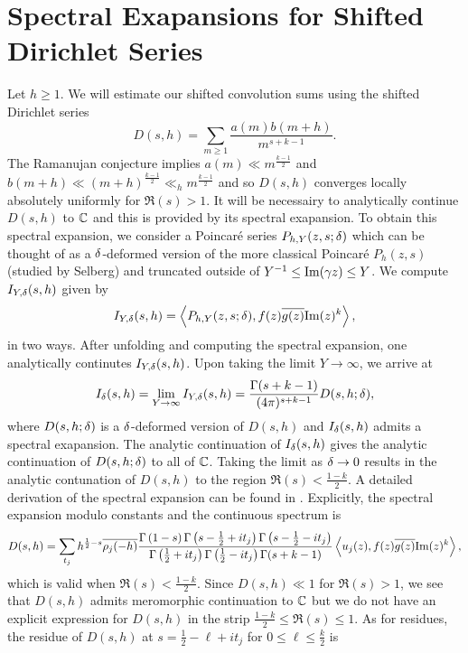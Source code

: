 \documentclass[12pt,reqno,oneside]{amsart}
\begin{document}
\section{Spectral Exapansions for Shifted Dirichlet Series}
  Let $h \ge 1$. We will estimate our shifted convolution sums using the shifted Dirichlet series
  \[
    D(s,h) = \sum_{m \ge 1}\frac{a(m)b(m+h)}{m^{s+k-1}}.
  \]
  The Ramanujan conjecture implies $a(m) \ll m^{\frac{k-1}{2}}$ and $b(m+h) \ll (m+h)^{\frac{k-1}{2}} \ll_{h} m^{\frac{k-1}{2}}$ and so $D(s,h)$ converges locally absolutely uniformly for $\Re(s) > 1$. It will be necessairy to analytically continue $D(s,h)$ to $\mathbb{C}$ and this is provided by its spectral exapansion. To obtain this spectral expansion, we consider a Poincar\'e series $P_{h,Y}(z,s;\delta)$ which can be thought of as a $\delta$-deformed version of the more classical  Poincar\'e $P_{h}(z,s)$ (studied by Selberg) and truncated outside of $Y^{-1} \le \mathrm{Im}(\gamma z) \le Y$. We compute $I_{Y,\delta}(s,h)$ given by
  \[
    I_{Y,\delta}(s,h) = \left\langle P_{h,Y}(z,s;\delta),f(z)\overline{g(z)}\mathrm{Im}(z)^{k}\right\rangle,
  \]
  in two ways. After unfolding and computing the spectral expansion, one analytically continutes $I_{Y,\delta}(s,h)$. Upon taking the limit $Y \to \infty$, we arrive at
  \[
    I_{\delta}(s,h) = \lim_{Y \to \infty}I_{Y,\delta}(s,h) = \frac{\Gamma(s+k-1)}{(4\pi)^{s+k-1}}D(s,h;\delta),
  \]
  where $D(s,h;\delta)$ is a $\delta$-deformed version of $D(s,h)$ and $I_{\delta}(s,h)$ admits a spectral exapansion. The analytic continuation of $I_{\delta}(s,h)$ gives the analytic continuation of $D(s,h;\delta)$ to all of $\mathbb{C}$. Taking the limit as $\delta \to 0$ results in the analytic contunation of $D(s,h)$ to the region $\Re(s) < \frac{1-k}{2}$. A detailed derivation of the spectral expansion can be found in \cite{HH}. Explicitly, the spectral expansion modulo constants and the continuous spectrum is
  \begin{equation}\label{equ:spectral_exapansion_positive_case}
    D(s,h) = \sum_{t_{j}}h^{\frac{1}{2}-s}\overline{\rho_{j}(-h)}\frac{\Gamma\left(1-s\right)\Gamma\left(s-\frac{1}{2}+it_{j}\right)\Gamma\left(s-\frac{1}{2}-it_{j}\right)}{\Gamma\left(\frac{1}{2}+it_{j}\right)\Gamma\left(\frac{1}{2}-it_{j}\right)\Gamma(s+k-1)}\left\langle u_{j}(z),f(z)\overline{g(z)}\mathrm{Im}(z)^{k}\right\rangle,
  \end{equation}
  which is valid when $\Re(s) < \frac{1-k}{2}$. Since $D(s,h) \ll 1$ for $\Re(s) > 1$, we see that $D(s,h)$ admits meromorphic continuation to $\mathbb{C}$ but we do not have an explicit expression for $D(s,h)$ in the strip $\frac{1-k}{2} \le \Re(s) \le 1$. As for residues, the residue of $D(s,h)$ at $s = \frac{1}{2}-\ell+it_{j}$ for $0 \le \ell \le \frac{k}{2}$ is
\end{document}
